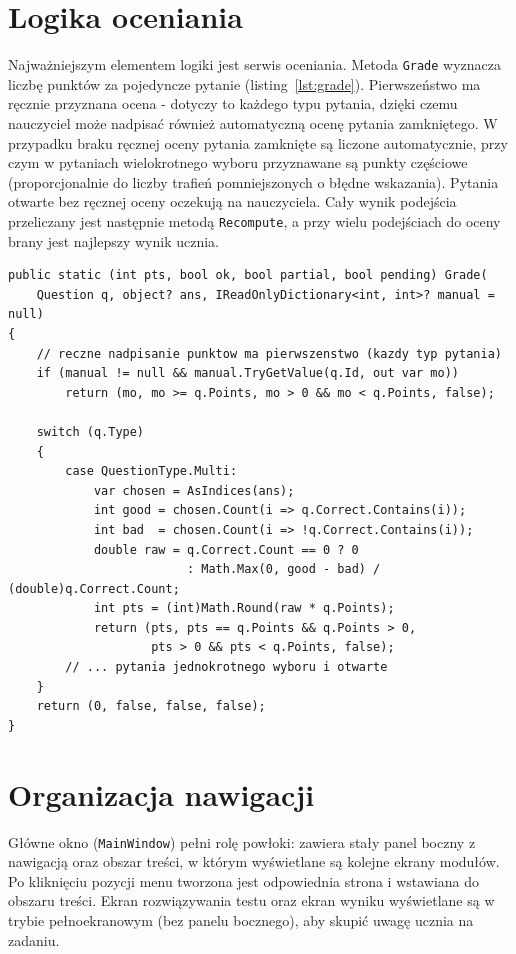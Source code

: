 \section{Logika oceniania}
\label{sec:logikaOceniania}

Najważniejszym elementem logiki jest serwis oceniania. Metoda \texttt{Grade} wyznacza liczbę punktów za pojedyncze
pytanie (listing~\ref{lst:grade}). Pierwszeństwo ma ręcznie przyznana ocena - dotyczy to każdego
typu pytania, dzięki czemu nauczyciel może nadpisać również automatyczną ocenę pytania zamkniętego.
W przypadku braku ręcznej oceny pytania zamknięte są liczone automatycznie, przy czym w pytaniach
wielokrotnego wyboru przyznawane są punkty częściowe (proporcjonalnie do liczby trafień
pomniejszonych o błędne wskazania). Pytania otwarte bez ręcznej oceny oczekują na nauczyciela.
Cały wynik podejścia przeliczany jest następnie metodą \texttt{Recompute}, a przy wielu podejściach
do oceny brany jest najlepszy wynik ucznia.

\begin{lstlisting}[caption={Ocenianie pojedynczego pytania (GradingService).}, label=lst:grade]
public static (int pts, bool ok, bool partial, bool pending) Grade(
    Question q, object? ans, IReadOnlyDictionary<int, int>? manual = null)
{
    // reczne nadpisanie punktow ma pierwszenstwo (kazdy typ pytania)
    if (manual != null && manual.TryGetValue(q.Id, out var mo))
        return (mo, mo >= q.Points, mo > 0 && mo < q.Points, false);

    switch (q.Type)
    {
        case QuestionType.Multi:
            var chosen = AsIndices(ans);
            int good = chosen.Count(i => q.Correct.Contains(i));
            int bad  = chosen.Count(i => !q.Correct.Contains(i));
            double raw = q.Correct.Count == 0 ? 0
                         : Math.Max(0, good - bad) / (double)q.Correct.Count;
            int pts = (int)Math.Round(raw * q.Points);
            return (pts, pts == q.Points && q.Points > 0,
                    pts > 0 && pts < q.Points, false);
        // ... pytania jednokrotnego wyboru i otwarte
    }
    return (0, false, false, false);
}
\end{lstlisting}

\section{Organizacja nawigacji}
\label{sec:nawigacja}

Główne okno (\texttt{MainWindow}) pełni rolę powłoki: zawiera stały panel boczny z nawigacją oraz
obszar treści, w którym wyświetlane są kolejne ekrany modułów. Po kliknięciu pozycji menu tworzona
jest odpowiednia strona i wstawiana do obszaru treści. Ekran rozwiązywania testu oraz ekran wyniku
wyświetlane są w trybie pełnoekranowym (bez panelu bocznego), aby skupić uwagę ucznia na zadaniu.

